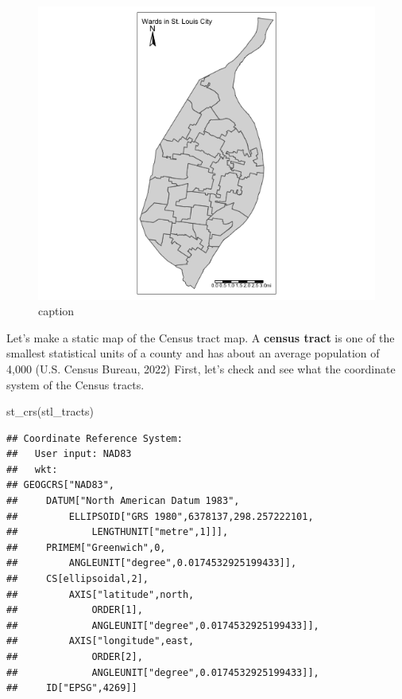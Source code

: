 \documentclass[
  krantz2]{krantz}
\makeatletter
\newenvironment{Shaded}{\begin{snugshade}}{\end{snugshade}}
\newcommand{\FunctionTok}[1]{\textcolor[rgb]{0,0,0}{#1}}
\newcommand{\NormalTok}[1]{#1}
\newenvironment{kframe}{%
\medskip{}
\setlength{\fboxsep}{.8em}
 \def\at@end@of@kframe{}%
 \ifinner\ifhmode%
  \def\at@end@of@kframe{\end{minipage}}%
  \begin{minipage}{\columnwidth}%
 \fi\fi%
 \def\FrameCommand##1{\hskip\@totalleftmargin \hskip-\fboxsep
 \colorbox{shadecolor}{##1}\hskip-\fboxsep
     \hskip-\linewidth \hskip-\@totalleftmargin \hskip\columnwidth}%
 \MakeFramed {\advance\hsize-\width
   \@totalleftmargin\z@ \linewidth\hsize
   \@setminipage}}%
 {\par\unskip\endMakeFramed%
 \at@end@of@kframe}
\renewenvironment{Shaded}{\begin{kframe}}{\end{kframe}}
\makeatother
\begin{document}
\begin{figure}
\centering
\includegraphics{tmap-images/code-3.png}
\caption{caption}
\end{figure}

Let's make a static map of the Census tract map. A \textbf{census tract} is one of the smallest statistical units of a county and has about an average population of 4,000 (U.S. Census Bureau, 2022) First, let's check and see what the coordinate system of the Census tracts.

\begin{Shaded}
\begin{Highlighting}[]
\FunctionTok{st\_crs}\NormalTok{(stl\_tracts)}
\end{Highlighting}
\end{Shaded}

\begin{verbatim}
## Coordinate Reference System:
##   User input: NAD83
##   wkt:
## GEOGCRS["NAD83",
##     DATUM["North American Datum 1983",
##         ELLIPSOID["GRS 1980",6378137,298.257222101,
##             LENGTHUNIT["metre",1]]],
##     PRIMEM["Greenwich",0,
##         ANGLEUNIT["degree",0.0174532925199433]],
##     CS[ellipsoidal,2],
##         AXIS["latitude",north,
##             ORDER[1],
##             ANGLEUNIT["degree",0.0174532925199433]],
##         AXIS["longitude",east,
##             ORDER[2],
##             ANGLEUNIT["degree",0.0174532925199433]],
##     ID["EPSG",4269]]
\end{verbatim}
\end{document}
